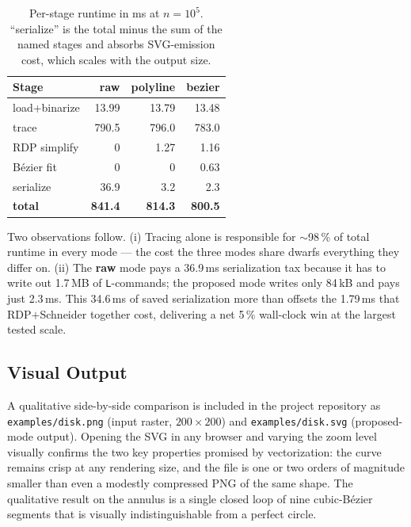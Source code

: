 \documentclass[twocolumn,a4paper,10pt]{article}
\begin{document}
\begin{table}[h]
\caption{Per-stage runtime in ms at $n=10^5$.  ``serialize'' is the
total minus the sum of the named stages and absorbs SVG-emission
cost, which scales with the output size.}
\label{tab:perstage}
\centering
\begin{tabular}{@{}lrrr@{}}
\toprule
Stage         & raw    & polyline & \textbf{bezier} \\ \midrule
load+binarize & 13.99  & 13.79    & 13.48 \\
trace         & 790.5  & 796.0    & 783.0 \\
RDP simplify  & 0      & 1.27     & 1.16  \\
B\'ezier fit  & 0      & 0        & 0.63  \\
serialize     & 36.9   & 3.2      & 2.3   \\
\midrule
\textbf{total} & \textbf{841.4} & \textbf{814.3} & \textbf{800.5} \\ \bottomrule
\end{tabular}
\end{table}

Two observations follow.  (i) Tracing alone is responsible for
$\sim$98\,\% of total runtime in every mode --- the cost the three
modes share dwarfs everything they differ on.  (ii) The \textbf{raw}
mode pays a 36.9\,ms serialization tax because it has to write out
1.7\,MB of \texttt{L}-commands; the proposed mode writes only 84\,kB
and pays just 2.3\,ms.  This 34.6\,ms of saved serialization more
than offsets the 1.79\,ms that RDP$+$Schneider together cost,
delivering a net 5\,\% wall-clock win at the largest tested scale.

\subsection{Visual Output}

A qualitative side-by-side comparison is included in the project
repository as \texttt{examples/disk.png} (input raster, $200{\times}200$)
and \texttt{examples/disk.svg} (proposed-mode output).  Opening the
SVG in any browser and varying the zoom level visually confirms the
two key properties promised by vectorization: the curve remains
crisp at any rendering size, and the file is one or two orders of
magnitude smaller than even a modestly compressed PNG of the same
shape.  The qualitative result on the annulus is a single closed
loop of nine cubic-B\'ezier segments that is visually
indistinguishable from a perfect circle.
\end{document}
